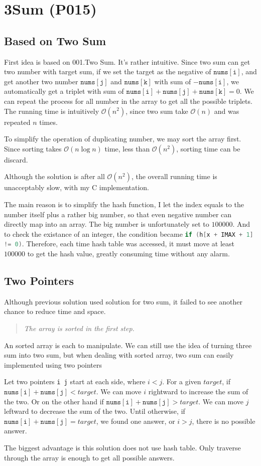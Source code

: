 \documentclass[varwidth]{standalone}
\begin{document}
\section{3Sum (P015)}
\subsection{Based on Two Sum}
First idea is based on 001.Two Sum. It's rather intuitive.
Since two sum can get two number with target sum,
if we set the target as the negative of $\mathtt{nums[i]}$,
and get another two number $\mathtt{nums[j]}$ and $\mathtt{nums[k]}$ with sum of
$-\mathtt{nums[i]}$, we automatically get a triplet with sum of
$\mathtt{nums[i]} + \mathtt{nums[j]} + \mathtt{nums[k]} = 0$.
We can repeat the process for all number in the array to get all the possible
triplets. The running time is intuitively $\mathcal{O}(n^2)$,  since two sum take
$\mathcal{O}(n)$ and was repeated $n$ times.

To simplify the operation of duplicating number, we may sort the array first.
Since sorting takes $\mathcal{O}(n \log n)$ time, less than $\mathcal{O}(n^2)$,
sorting time can be discard.

Although the solution is after all $\mathcal{O}(n^2)$, the overall running time
is unacceptably slow, with my C implementation.

The main reason is to simplify the hash function, I let the index equals to the
number itself plus a rather big number, so that even negative number can
directly map into an array. The big number is unfortunately set to $100000$.
And to check the existance of an integer, the condition became
\lstinline[language=c]{if (h[x + IMAX + 1] != 0)}.
Therefore, each time hash table was accessed, it must move at least $100000$ to
get the hash value, greatly consuming time without any alarm.

\subsection{Two Pointers}
Although previous solution used solution for two sum, it failed to see another
chance to reduce time and space.
\begin{quote}
    \emph{The array is sorted in the first step.}
\end{quote}

An sorted array is each to manipulate.
We can still use the idea of turning three sum into two sum, but when dealing
with sorted array, two sum can easily implemented using two pointers

Let two pointers \texttt{i j} start at each side, where $i < j$.
For a given $target$, if $\mathtt{nums[i]} + \mathtt{nums[j]} < target$.
We can move $i$ rightward to increase the sum of the two.
Or on the other hand if $\mathtt{nums[i]} + \mathtt{nums[j]} > target$.
We can move $j$ leftward to decrease the sum of the two.
Until otherwise, if $\mathtt{nums[i]} + \mathtt{nums[j]} = target$, we
found one answer, or $i > j$, there is no possible answer.

The biggest advantage is this solution does not use hash table. Only traverse
through the array is enough to get all possible answers.
\end{document}

